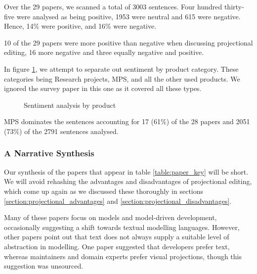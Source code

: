 Over the 29 papers, we scanned a total of 3003 sentences.
Four hundred thirty-five were analysed as being positive, 1953 were neutral and 615 were negative.
Hence, 14\% were positive, and 16\% were negative.

10 of the 29 papers were more positive than negative when discussing projectional editing, 16 more negative and three equally negative and positive.

In figure \ref{fig:sentiment_analysis2}, we attempt to separate out sentiment by product category.  
These categories being Research projects, MPS, and all the other used products.
We ignored the survey paper in this one as it covered all these types.

\begin{figure}[H]
    \centering
    \caption{Sentiment analysis by product}
    \label{fig:sentiment_analysis2}
\end{figure}

MPS dominates the sentences accounting for 17 (61\%) of the 28 papers and 2051 (73\%) of the 2791 sentences analysed.

\subsubsection{A Narrative Synthesis}
Our synthesis of the papers that appear in table \ref{table:paper_key} will be short.
We will avoid rehashing the advantages and disadvantages of projectional editing, which come up again as we discussed these thoroughly in sections \ref{section:projectional_advantages} and \ref{section:projectional_disadvantages}.

Many of these papers focus on models and model-driven development, occasionally suggesting a shift towards textual modelling languages.
However, other papers point out that text does not always supply a suitable level of abstraction in modelling.
One paper suggested that developers prefer text, whereas maintainers and domain experts prefer visual projections, though this suggestion was unsourced.

